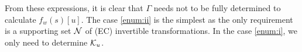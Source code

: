 From these expressions, it is clear that $\Gamma$ needs not to be fully determined to calculate $f_w(s)[u]$. The case \ref{enum:ii} is the simplest as the only requirement is a supporting set $\mathcal{N}$ of (EC) invertible transformations. In the case \ref{enum:i}, we only need to determine $\mathcal{K}_u$.





